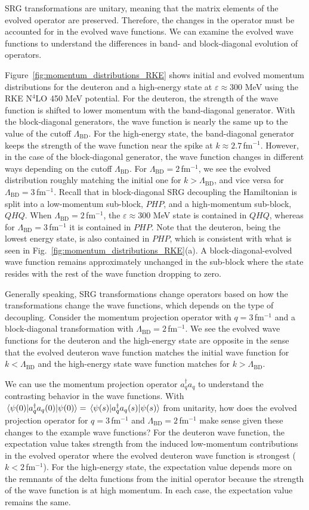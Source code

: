 \documentclass[10pt,aps,prc,floatfix,twocolumn,nofootinbib]{revtex4-1}
\newcommand{\LambdaBD}{{\Lambda_{\text{BD}}}}
\newcommand{\ataq}{a^{\dagger}_q a_q}
\begin{document}
SRG transformations are unitary, meaning that the matrix elements of the evolved operator are preserved.
Therefore, the changes in the operator must be accounted for in the evolved wave functions.
We can examine the evolved wave functions to understand the differences in band- and block-diagonal evolution of operators.


Figure~\ref{fig:momentum_distributions_RKE} shows initial and evolved momentum distributions for the deuteron and a high-energy state at $\varepsilon \approx 300$ MeV using the RKE N$^4$LO 450 MeV potential.
For the deuteron, the strength of the wave function is shifted to lower momentum with the band-diagonal generator.
With the block-diagonal generators, the wave function is nearly the same up to the value of the cutoff $\LambdaBD$.
For the high-energy state, the band-diagonal generator keeps the strength of the wave function near the spike at $k \approx 2.7$\,fm$^{-1}$.
However, in the case of the block-diagonal generator, the wave function changes in different ways depending on the cutoff $\LambdaBD$.
For $\LambdaBD=2$\,fm$^{-1}$, we see the evolved distribution roughly matching the initial one for $k>\LambdaBD$, and vice versa for $\LambdaBD=3$\,fm$^{-1}$. 
Recall that in block-diagonal SRG decoupling the Hamiltonian is split into a low-momentum sub-block, $P H P$, and a high-momentum sub-block, $Q H Q$.
When $\LambdaBD=2$\,fm$^{-1}$, the $\varepsilon \approx 300$ MeV state is contained in $Q H Q$, whereas for $\LambdaBD=3$\,fm$^{-1}$ it is contained in $P H P$.
Note that the deuteron, being the lowest energy state, is also contained in $P H P$, which is consistent with what is seen in Fig.~\ref{fig:momentum_distributions_RKE}(a).
A block-diagonal-evolved wave function remains approximately unchanged in the sub-block where the state resides with the rest of the wave function dropping to zero.


Generally speaking, SRG transformations change operators based on how the transformations change the wave functions, which depends on the type of decoupling.
Consider the momentum projection operator with $q=3$\,fm$^{-1}$ and a block-diagonal transformation with $\LambdaBD=2$\,fm$^{-1}$.
We see the evolved wave functions for the deuteron and the high-energy state are opposite in the sense that the evolved deuteron wave function matches the initial wave function for $k<\LambdaBD$ and the high-energy state wave function matches for $k>\LambdaBD$.


We can use the momentum projection operator $\ataq$ to understand the contrasting behavior in the wave functions.
With $\mel{\psi(0)}{\ataq(0)}{\psi(0)} = \mel{\psi(s)}{\ataq(s)}{\psi(s)}$ from unitarity, how does the evolved projection operator for $q=3$\,fm$^{-1}$ and $\LambdaBD=2$\,fm$^{-1}$ make sense given these changes to the example wave functions?
For the deuteron wave function, the expectation value takes strength from the induced low-momentum contributions in the evolved operator where the evolved deuteron wave function is strongest ($k<2$\,fm$^{-1}$).
For the high-energy state, the expectation value depends more on the remnants of the delta functions from the initial operator because the strength of the wave function is at high momentum.
In each case, the expectation value remains the same.
\end{document}

